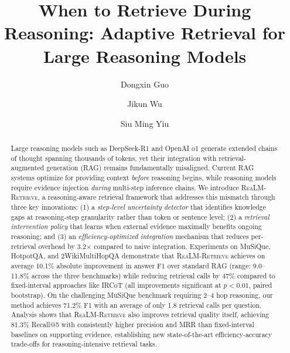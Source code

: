 \documentclass[sigconf,natbib=true]{acmart}
\newcommand{\methodname}{\textsc{ReaLM-Retrieve}}
\begin{document}
\title{When to Retrieve During Reasoning: Adaptive Retrieval for Large Reasoning Models}

\author{Dongxin Guo}

\author{Jikun Wu}
\authornotemark[1] 

\author{Siu Ming Yiu}

\begin{abstract}
Large reasoning models such as DeepSeek-R1 and OpenAI o1 generate extended chains of thought spanning thousands of tokens, yet their integration with retrieval-augmented generation (RAG) remains fundamentally misaligned. Current RAG systems optimize for providing context \emph{before} reasoning begins, while reasoning models require evidence injection \emph{during} multi-step inference chains. We introduce \methodname{}, a reasoning-aware retrieval framework that addresses this mismatch through three key innovations: (1) a \emph{step-level uncertainty detector} that identifies knowledge gaps at reasoning-step granularity rather than token or sentence level; (2) a \emph{retrieval intervention policy} that learns when external evidence maximally benefits ongoing reasoning; and (3) an \emph{efficiency-optimized integration} mechanism that reduces per-retrieval overhead by 3.2$\times$ compared to naive integration. Experiments on MuSiQue, HotpotQA, and 2WikiMultiHopQA demonstrate that \methodname{} achieves on average 10.1\% absolute improvement in answer F1 over standard RAG (range: 9.0--11.8\% across the three benchmarks) while reducing retrieval calls by 47\% compared to fixed-interval approaches like IRCoT (all improvements significant at $p<0.01$, paired bootstrap). On the challenging MuSiQue benchmark requiring 2--4 hop reasoning, our method achieves 71.2\% F1 with an average of only 1.8 retrieval calls per question. Analysis shows that \methodname{} also improves retrieval quality itself, achieving 81.3\% Recall@5 with consistently higher precision and MRR than fixed-interval baselines on supporting evidence, establishing new state-of-the-art efficiency-accuracy trade-offs for reasoning-intensive retrieval tasks.
\end{abstract}
\end{document}
